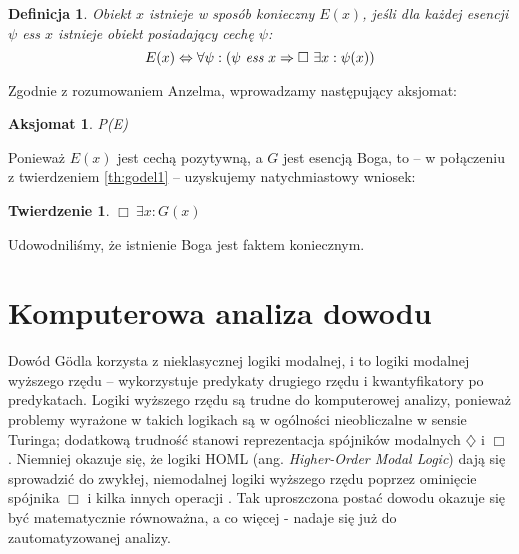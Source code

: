 \documentclass[
	runningheads
]{llncs}
\newtheorem{theorem-pl}{Twierdzenie}
\newtheorem{definition-pl}{Definicja}
\newtheorem{axiom-pl}{Aksjomat}
\begin{document}
\begin{definition-pl} \label{def:godel-existence}
	Obiekt $x$ istnieje w sposób konieczny $E(x)$, jeśli dla każdej esencji $\psi$ \emph{ess} $x$ istnieje obiekt posiadający cechę $\psi$:
	\begin{equation*}
	E(x) \Leftrightarrow \forall \psi: \left( \psi\ \emph{ess}\ x \Rightarrow\Box\ \exists x: \psi(x) \right)
	\end{equation*}
\end{definition-pl}
\noindent Zgodnie z rozumowaniem Anzelma, wprowadzamy następujący aksjomat:
\begin{axiom-pl} \label{axiom:godel5}
	P(E)
\end{axiom-pl}
\noindent Ponieważ $E(x)$ jest cechą pozytywną, a $G$ jest esencją Boga, to -- w połączeniu z twierdzeniem \ref{th:godel1} -- uzyskujemy natychmiastowy wniosek:
\begin{theorem-pl} \label{th:godel-god}
	$\Box\ \exists x: G(x)$
\end{theorem-pl}
\noindent Udowodniliśmy, że istnienie Boga jest faktem koniecznym.

\section{Komputerowa analiza dowodu} \label{sec:komputerowa-analiza}
Dowód G\"odla korzysta z nieklasycznej logiki modalnej, i to logiki modalnej wyższego rzędu -- wykorzystuje predykaty drugiego rzędu i kwantyfikatory po predykatach. Logiki wyższego rzędu są trudne do komputerowej analizy, ponieważ problemy wyrażone w takich logikach są w ogólności nieobliczalne w sensie Turinga; dodatkową trudność stanowi reprezentacja spójników modalnych $\diamondsuit$ i $\Box$. Niemniej okazuje się, że logiki HOML (ang. \textit{Higher-Order Modal Logic}) dają się sprowadzić do zwykłej, niemodalnej logiki wyższego rzędu poprzez ominięcie spójnika $\Box$ i kilka innych operacji \cite{benzmuller2014}. Tak uproszczona postać dowodu okazuje się być matematycznie równoważna, a co więcej - nadaje się już do zautomatyzowanej analizy. 
\end{document}
